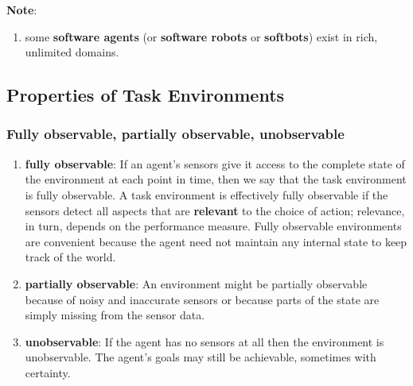 \vspace{0.3cm}

\textbf{Note}:
\begin{enumerate}
    \item some \textbf{software agents} (or \textbf{software robots} or \textbf{softbots}) exist in rich, unlimited domains.
    \hfill \cite{ai/book/Artificial-Intelligence-A-Modern-Approach/Russell-Norvig}


\end{enumerate}


\clearpage
\subsection{Properties of Task Environments \cite{ai/book/Artificial-Intelligence-A-Modern-Approach/Russell-Norvig}}

\subsubsection{Fully observable, partially observable, unobservable}
\begin{enumerate}
    \item \textbf{fully observable}: If an agent’s sensors give it access to the complete state of the environment at each point in time, then we say that the task environment is fully observable.
    A task environment is effectively fully observable if the sensors detect all aspects that are \textbf{relevant} to the choice of action; relevance, in turn, depends on the performance measure.
    Fully observable environments are convenient because the agent need not maintain any internal state to keep track of the world.
    \hfill \cite{ai/book/Artificial-Intelligence-A-Modern-Approach/Russell-Norvig}

    \vspace{0.2cm}

    \item \textbf{partially observable}: An environment might be partially observable because of noisy and inaccurate sensors or because parts of the state are simply missing from the sensor data.
    \hfill \cite{ai/book/Artificial-Intelligence-A-Modern-Approach/Russell-Norvig}

    \vspace{0.2cm}

    \item \textbf{unobservable}: If the agent has no sensors at all then the environment is unobservable.
    The agent’s goals may still be achievable, sometimes with certainty.
    \hfill \cite{ai/book/Artificial-Intelligence-A-Modern-Approach/Russell-Norvig}
\end{enumerate}

